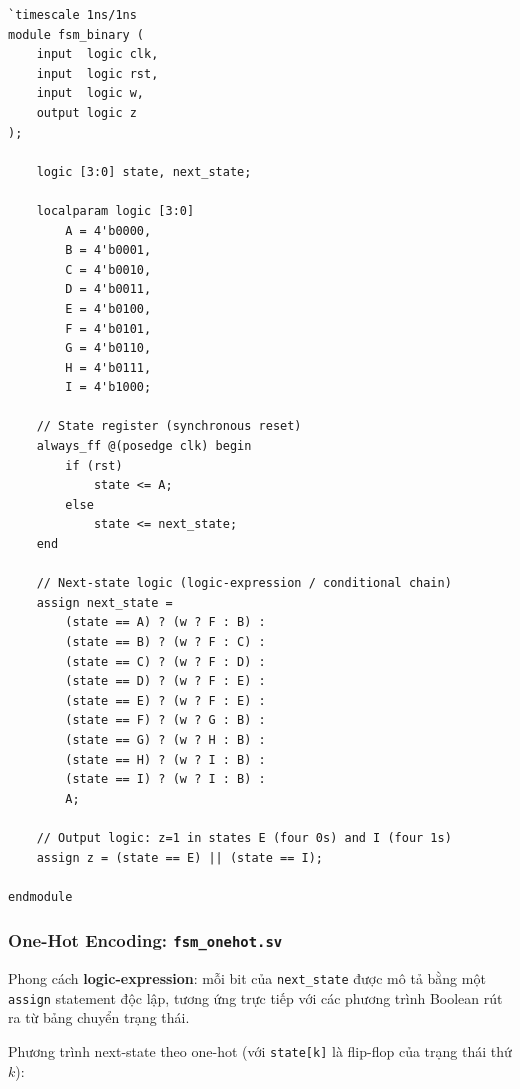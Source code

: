 \documentclass[12pt, a4paper]{article}
\begin{document}
\begin{lstlisting}[caption={\texttt{00\_src/fsm\_binary.sv} -- Binary Encoding, Logic-Expression Style.},
                   label={lst:exp3-binary}]
`timescale 1ns/1ns
module fsm_binary (
    input  logic clk,
    input  logic rst,
    input  logic w,
    output logic z
);

    logic [3:0] state, next_state;

    localparam logic [3:0]
        A = 4'b0000,
        B = 4'b0001,
        C = 4'b0010,
        D = 4'b0011,
        E = 4'b0100,
        F = 4'b0101,
        G = 4'b0110,
        H = 4'b0111,
        I = 4'b1000;

    // State register (synchronous reset)
    always_ff @(posedge clk) begin
        if (rst)
            state <= A;
        else
            state <= next_state;
    end

    // Next-state logic (logic-expression / conditional chain)
    assign next_state =
        (state == A) ? (w ? F : B) :
        (state == B) ? (w ? F : C) :
        (state == C) ? (w ? F : D) :
        (state == D) ? (w ? F : E) :
        (state == E) ? (w ? F : E) :
        (state == F) ? (w ? G : B) :
        (state == G) ? (w ? H : B) :
        (state == H) ? (w ? I : B) :
        (state == I) ? (w ? I : B) :
        A;

    // Output logic: z=1 in states E (four 0s) and I (four 1s)
    assign z = (state == E) || (state == I);

endmodule
\end{lstlisting}

\subsubsection{One-Hot Encoding: \texttt{fsm\_onehot.sv}}

Phong cách \textbf{logic-expression}: mỗi bit của \texttt{next\_state} được mô tả bằng một \texttt{assign} statement độc lập, tương ứng trực tiếp với các phương trình Boolean rút ra từ bảng chuyển trạng thái.

Phương trình next-state theo one-hot (với \texttt{state[k]} là flip-flop của trạng thái thứ $k$):
\end{document}
